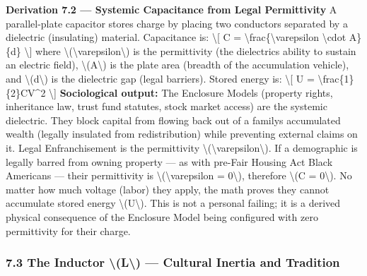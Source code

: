 {\textbf{Derivation 7.2 --- Systemic Capacitance from Legal Permittivity}
A parallel-plate capacitor stores charge by placing two conductors
separated by a dielectric (insulating) material. Capacitance is:
\textbackslash{[} C = \textbackslash frac\{\textbackslash varepsilon
\textbackslash cdot A\}\{d\} \textbackslash{]} where
\textbackslash(\textbackslash varepsilon\textbackslash) is the
permittivity (the dielectric\textquotesingle s ability to sustain an
electric field), \textbackslash(A\textbackslash) is the plate area
(breadth of the accumulation vehicle), and
\textbackslash(d\textbackslash) is the dielectric gap (legal barriers).
Stored energy is: \textbackslash{[} U =
\textbackslash frac\{1\}\{2\}CV\^{}2 \textbackslash{]}
\textbf{Sociological output:} The Enclosure Models (property rights,
inheritance law, trust fund statutes, stock market access) are the
systemic dielectric. They block capital from flowing back out of a
family\textquotesingle s accumulated wealth (legally insulated from
redistribution) while preventing external claims on it. Legal
Enfranchisement is the permittivity
\textbackslash(\textbackslash varepsilon\textbackslash). If a
demographic is legally barred from owning property --- as with pre-Fair
Housing Act Black Americans --- their permittivity is
\textbackslash(\textbackslash varepsilon = 0\textbackslash), therefore
\textbackslash(C = 0\textbackslash). No matter how much voltage (labor)
they apply, the math proves they cannot accumulate stored energy
\textbackslash(U\textbackslash). This is not a personal failing; it is a
derived physical consequence of the Enclosure Model being configured
with zero permittivity for their charge.

\subsubsection{7.3 The Inductor \textbackslash(L\textbackslash) ---
Cultural Inertia and
Tradition}\label{the-inductor-l-cultural-inertia-and-tradition}

}
